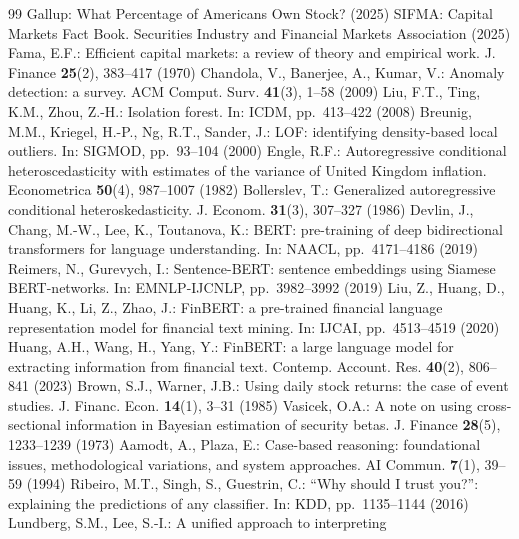\documentclass[runningheads]{llncs}
\begin{document}
\begin{thebibliography}{99}
 Gallup: What Percentage of Americans Own Stock? (2025)
 SIFMA: Capital Markets Fact Book. Securities Industry and
Financial Markets Association (2025)
 Fama, E.F.: Efficient capital markets: a review of theory and
empirical work. J. Finance \textbf{25}(2), 383--417 (1970)
 Chandola, V., Banerjee, A., Kumar, V.: Anomaly detection: a
survey. ACM Comput. Surv. \textbf{41}(3), 1--58 (2009)
 Liu, F.T., Ting, K.M., Zhou, Z.-H.: Isolation forest. In: ICDM,
pp.\ 413--422 (2008)
 Breunig, M.M., Kriegel, H.-P., Ng, R.T., Sander, J.: LOF:
identifying density-based local outliers. In: SIGMOD, pp.\ 93--104 (2000)
 Engle, R.F.: Autoregressive conditional heteroscedasticity with
estimates of the variance of United Kingdom inflation. Econometrica \textbf{50}(4),
987--1007 (1982)
 Bollerslev, T.: Generalized autoregressive conditional
heteroskedasticity. J. Econom. \textbf{31}(3), 307--327 (1986)
 Devlin, J., Chang, M.-W., Lee, K., Toutanova, K.: BERT:
pre-training of deep bidirectional transformers for language understanding. In: NAACL,
pp.\ 4171--4186 (2019)
 Reimers, N., Gurevych, I.: Sentence-BERT: sentence embeddings
using Siamese BERT-networks. In: EMNLP-IJCNLP, pp.\ 3982--3992 (2019)
 Liu, Z., Huang, D., Huang, K., Li, Z., Zhao, J.: FinBERT: a
pre-trained financial language representation model for financial text mining. In: IJCAI,
pp.\ 4513--4519 (2020)
 Huang, A.H., Wang, H., Yang, Y.: FinBERT: a large language model
for extracting information from financial text. Contemp. Account. Res. \textbf{40}(2),
806--841 (2023)
 Brown, S.J., Warner, J.B.: Using daily stock returns: the case of
event studies. J. Financ. Econ. \textbf{14}(1), 3--31 (1985)
 Vasicek, O.A.: A note on using cross-sectional information in
Bayesian estimation of security betas. J. Finance \textbf{28}(5), 1233--1239 (1973)
 Aamodt, A., Plaza, E.: Case-based reasoning: foundational issues,
methodological variations, and system approaches. AI Commun. \textbf{7}(1), 39--59 (1994)
 Ribeiro, M.T., Singh, S., Guestrin, C.: ``Why should I trust
you?'': explaining the predictions of any classifier. In: KDD, pp.\ 1135--1144 (2016)
 Lundberg, S.M., Lee, S.-I.: A unified approach to interpreting

\end{thebibliography}
\end{document}
